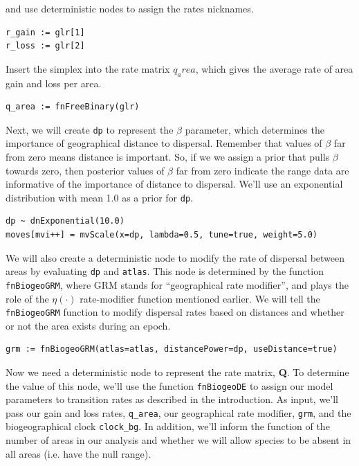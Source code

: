 and use deterministic nodes to assign the rates nicknames.

\begin{snugshade}
\begin{lstlisting}
r_gain := glr[1]
r_loss := glr[2]
\end{lstlisting}
\end{snugshade}

Insert the simplex into the rate matrix {\tt $q_area$}, which gives the average rate of area gain and loss per area.

\begin{snugshade}
\begin{lstlisting}
q_area := fnFreeBinary(glr)
\end{lstlisting}
\end{snugshade}

Next, we will create {\tt dp} to represent the $\beta$ parameter, which determines the importance of geographical distance to dispersal.
Remember that values of $\beta$ far from zero means distance is important.
So, if we we assign a prior that pulls $\beta$ towards zero, then posterior values of $\beta$ far from zero indicate the range data are informative of the importance of distance to dispersal.
We'll use an exponential distribution with mean 1.0 as a prior for {\tt dp}.

\begin{snugshade}
\begin{lstlisting}
dp ~ dnExponential(10.0)
moves[mvi++] = mvScale(x=dp, lambda=0.5, tune=true, weight=5.0)
\end{lstlisting}
\end{snugshade}

We will also create a deterministic node to modify the rate of dispersal between areas by evaluating {\tt dp} and {\tt atlas}.
This node is determined by the function {\tt fnBiogeoGRM}, where GRM stands for ``geographical rate modifier'', and plays the role of the $\eta(\cdot)$ rate-modifier function mentioned earlier.
We will tell the {\tt fnBiogeoGRM} function to modify dispersal rates based on distances and whether or not the area exists during an epoch.

\begin{snugshade}
\begin{lstlisting}
grm := fnBiogeoGRM(atlas=atlas, distancePower=dp, useDistance=true)
\end{lstlisting}
\end{snugshade}

Now we need a deterministic node to represent the rate matrix, {\bf Q}.
To determine the value of this node, we'll use the function {\tt fnBiogeoDE} to assign our model parameters to transition rates as described in the introduction.
As input, we'll pass our gain and loss rates, {\tt q\_area}, our geographical rate modifier, {\tt grm}, and the biogeographical clock {\tt clock\_bg}.
In addition, we'll inform the function of the number of areas in our analysis and whether we will allow species to be absent in all areas (i.e. have the null range).


